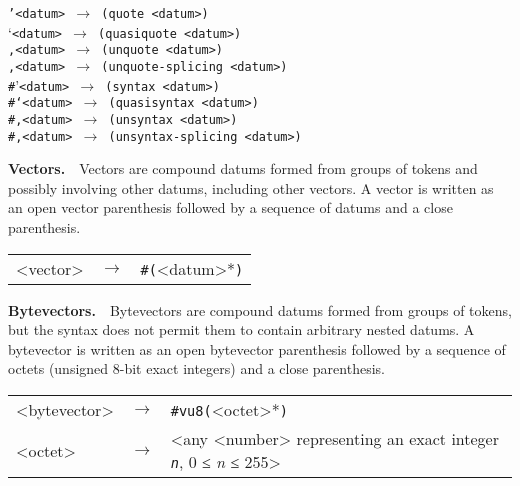 \begin{alltt}
'\textless{}datum\textgreater{} \(\rightarrow\) (quote \textless{}datum\textgreater{})
`\textless{}datum\textgreater{} \(\rightarrow\) (quasiquote \textless{}datum\textgreater{})
,\textless{}datum\textgreater{} \(\rightarrow\) (unquote \textless{}datum\textgreater{})
,\@{}\textless{}datum\textgreater{} \(\rightarrow\) (unquote-splicing \textless{}datum\textgreater{})
\#{}'\textless{}datum\textgreater{} \(\rightarrow\) (syntax \textless{}datum\textgreater{})
\#{}`\textless{}datum\textgreater{} \(\rightarrow\) (quasisyntax \textless{}datum\textgreater{})
\#{},\textless{}datum\textgreater{} \(\rightarrow\) (unsyntax \textless{}datum\textgreater{})
\#{},\@{}\textless{}datum\textgreater{} \(\rightarrow\) (unsyntax-splicing \textless{}datum\textgreater{})
\end{alltt}


\textbf{Vectors\label{grammar_grammar_vectors}.}  \label{grammar_s22}Vectors are compound datums formed from groups of tokens and possibly
involving other datums, including other vectors.
A vector is written as an open vector parenthesis followed by a
sequence of datums and a close parenthesis.


  
  
  {\footnotesize
\begin{tabular}[H]{lcl}

\textless{}vector\textgreater{} & \(\longrightarrow\) & \texttt{\#{}(}\textless{}datum\textgreater{}*\texttt{)}
 \\
\end{tabular}
}


\textbf{Bytevectors\label{grammar_grammar_bytevectors}.}  \label{grammar_s23}Bytevectors are compound datums formed from groups of tokens, but the
syntax does not permit them to contain arbitrary nested datums.
A bytevector is written as an open bytevector parenthesis followed by a
sequence of octets (unsigned 8-bit exact integers) and a close
parenthesis.


  
  
  {\footnotesize
\begin{tabular}[H]{lcl}

\textless{}bytevector\textgreater{} & \(\longrightarrow\) & \texttt{\#{}vu8(}\textless{}octet\textgreater{}*\texttt{)} \\

\textless{}octet\textgreater{} & \(\longrightarrow\) & \textless{}any \textless{}number\textgreater{} representing an exact integer \texttt{\textit{n}}, 0 ≤ \textit{n} ≤ 255\textgreater{}
 \\
\end{tabular}
}



